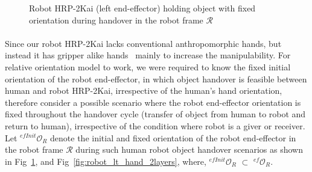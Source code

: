 \documentclass[a4paper, 12pt, oneside]{Thesis}  %
\begin{document}
\begin{figure}[ht]
	\caption{Robot HRP-2Kai (left end-effector) holding object with fixed orientation during handover in the robot frame $\mathcal{R}$}
	\label{fig:robot_lt_hand_obj}
\end{figure} 

\paragraph*{}
Since our robot HRP-2Kai lacks conventional anthropomorphic hands, but instead it has gripper alike hands~\cite{kaneko2015humanoid, stasse2019overview} mainly to increase the manipulability. For relative orientation model to work, we were required to know the fixed initial orientation of the robot end-effector, in which object handover is feasible between human and robot HRP-2Kai, irrespective of the human's hand orientation, therefore consider a possible  scenario where the robot end-effector orientation is fixed throughout the handover cycle (transfer of object from human to robot and return to human), irrespective of the condition where robot is a giver or receiver. Let ${{}^{efInit}\mathcal{O}_R}$ denote the initial and fixed orientation of the robot end-effector in the robot frame $\mathcal{R}$ during such human robot object handover scenarios as shown in Fig~\ref{fig:robot_lt_hand_obj}, and Fig~\ref{fig:robot_lt_hand_2layers}, where, ${{}^{efInit}\mathcal{O}_R}$ $\subset$ ${{}^{ef}\mathcal{O}_R}$.
\end{document}
